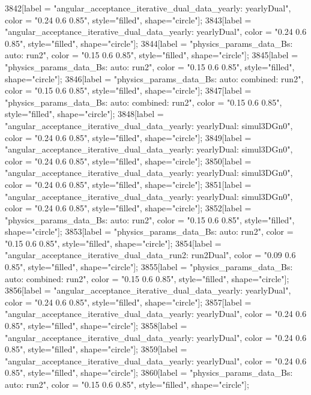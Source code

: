 {	3842[label = "angular_acceptance_iterative_dual_data_yearly\nangacc: yearlyDual", color = "0.24 0.6 0.85", style="filled", shape="circle"];
	3843[label = "angular_acceptance_iterative_dual_data_yearly\nangacc: yearlyDual", color = "0.24 0.6 0.85", style="filled", shape="circle"];
	3844[label = "physics_params_data_Bs\nfit: auto\nyear: run2", color = "0.15 0.6 0.85", style="filled", shape="circle"];
	3845[label = "physics_params_data_Bs\nfit: auto\nyear: run2", color = "0.15 0.6 0.85", style="filled", shape="circle"];
	3846[label = "physics_params_data_Bs\nfit: auto\ntrigger: combined\nyear: run2", color = "0.15 0.6 0.85", style="filled", shape="circle"];
	3847[label = "physics_params_data_Bs\nfit: auto\ntrigger: combined\nyear: run2", color = "0.15 0.6 0.85", style="filled", shape="circle"];
	3848[label = "angular_acceptance_iterative_dual_data_yearly\nangacc: yearlyDual\ntimeacc: simul3DGn0", color = "0.24 0.6 0.85", style="filled", shape="circle"];
	3849[label = "angular_acceptance_iterative_dual_data_yearly\nangacc: yearlyDual\ntimeacc: simul3DGn0", color = "0.24 0.6 0.85", style="filled", shape="circle"];
	3850[label = "angular_acceptance_iterative_dual_data_yearly\nangacc: yearlyDual\ntimeacc: simul3DGn0", color = "0.24 0.6 0.85", style="filled", shape="circle"];
	3851[label = "angular_acceptance_iterative_dual_data_yearly\nangacc: yearlyDual\ntimeacc: simul3DGn0", color = "0.24 0.6 0.85", style="filled", shape="circle"];
	3852[label = "physics_params_data_Bs\nfit: auto\nyear: run2", color = "0.15 0.6 0.85", style="filled", shape="circle"];
	3853[label = "physics_params_data_Bs\nfit: auto\nyear: run2", color = "0.15 0.6 0.85", style="filled", shape="circle"];
	3854[label = "angular_acceptance_iterative_dual_data_run2\nangacc: run2Dual", color = "0.09 0.6 0.85", style="filled", shape="circle"];
	3855[label = "physics_params_data_Bs\nfit: auto\ntrigger: combined\nyear: run2", color = "0.15 0.6 0.85", style="filled", shape="circle"];
	3856[label = "angular_acceptance_iterative_dual_data_yearly\nangacc: yearlyDual", color = "0.24 0.6 0.85", style="filled", shape="circle"];
	3857[label = "angular_acceptance_iterative_dual_data_yearly\nangacc: yearlyDual", color = "0.24 0.6 0.85", style="filled", shape="circle"];
	3858[label = "angular_acceptance_iterative_dual_data_yearly\nangacc: yearlyDual", color = "0.24 0.6 0.85", style="filled", shape="circle"];
	3859[label = "angular_acceptance_iterative_dual_data_yearly\nangacc: yearlyDual", color = "0.24 0.6 0.85", style="filled", shape="circle"];
	3860[label = "physics_params_data_Bs\nfit: auto\nyear: run2", color = "0.15 0.6 0.85", style="filled", shape="circle"];
}
